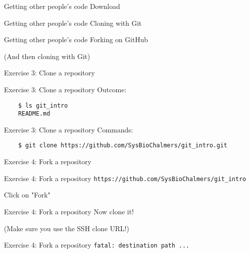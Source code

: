 \documentclass{beamer}
\begin{document}
\begin{frame}{Getting other people's code}
  \center
  \Huge Download
\end{frame}

\begin{frame}{Getting other people's code}
  \center
  \Huge Cloning with Git
\end{frame}

\begin{frame}{Getting other people's code}
  \center
  \Huge Forking on GitHub

  \Large (And then cloning with Git)
\end{frame}

\begin{frame}{}
  \center
  \Huge Exercise 3: Clone a repository
\end{frame}

\begin{frame}[fragile]{Exercise 3: Clone a repository}
  Outcome:

  \begin{verbatim}
    $ ls git_intro
    README.md
  \end{verbatim}
\end{frame}

\begin{frame}[fragile]{Exercise 3: Clone a repository}
  Commands:

  \begin{verbatim}
    $ git clone https://github.com/SysBioChalmers/git_intro.git
  \end{verbatim}
\end{frame}

\begin{frame}{}
  \center
  \Huge Exercise 4: Fork a repository
\end{frame}

\begin{frame}{Exercise 4: Fork a repository}
  \center
  \large \texttt{https://github.com/SysBioChalmers/git_intro}
  \pause

  \Large Click on "Fork"
\end{frame}

\begin{frame}{Exercise 4: Fork a repository}
  \center
  \Huge Now clone it!
  \pause

  \LARGE (Make sure you use the SSH clone URL!)
\end{frame}

\begin{frame}[fragile]{Exercise 4: Fork a repository}
  \center
  \huge \texttt{fatal: destination path ...}
\end{frame}
\end{document}
